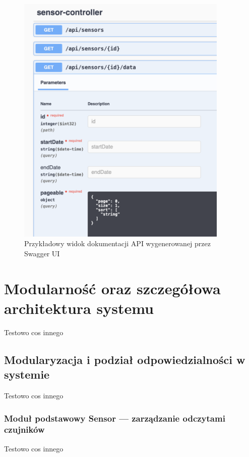 \documentclass[a4paper,12pt,openany]{book}
\begin{document}
\begin{figure}[H]
    \centering
    \includegraphics[width=0.9\textwidth]{swagger.png}
    \caption{Przykładowy widok dokumentacji API wygenerowanej przez Swagger UI}
    \label{fig:swagger-ui}
\end{figure}

\chapter{Modularność oraz szczegółowa architektura systemu}

Testowo cos innego

\section{Modularyzacja i podział odpowiedzialności w systemie}

Testowo cos innego

\subsection{Moduł podstawowy Sensor --- zarządzanie odczytami czujników}

Testowo cos innego
\end{document}
